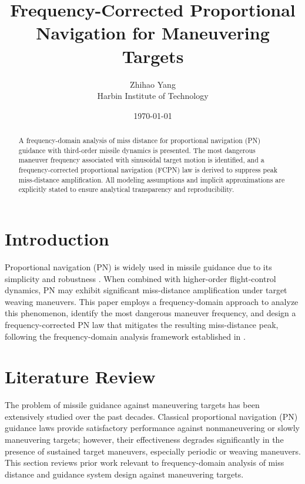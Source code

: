 \documentclass[11pt,a4paper]{article}
\title{Frequency-Corrected Proportional Navigation for Maneuvering Targets}
\author{Zhihao Yang \\ Harbin Institute of Technology}
\date{\today}
\begin{document}
\maketitle

\begin{abstract}
A frequency-domain analysis of miss distance for proportional navigation (PN) guidance with third-order missile dynamics is presented. The most dangerous maneuver frequency associated with sinusoidal target motion is identified, and a frequency-corrected proportional navigation (FCPN) law is derived to suppress peak miss-distance amplification. All modeling assumptions and implicit approximations are explicitly stated to ensure analytical transparency and reproducibility.
\end{abstract}

\section{Introduction}
Proportional navigation (PN) is widely used in missile guidance due to its simplicity and robustness \cite{Zarchan1995}.
 When combined with higher-order flight-control dynamics, PN may exhibit significant miss-distance amplification under target weaving maneuvers. This paper employs a frequency-domain approach to analyze this phenomenon, identify the most dangerous maneuver frequency, and design a frequency-corrected PN law that mitigates the resulting miss-distance peak, following the frequency-domain analysis framework established in \cite{Yanushevsky2004,Yanushevsky2007}.

\section{Literature Review}
\label{sec:literature}

The problem of missile guidance against maneuvering targets has been extensively studied over the past decades. Classical proportional navigation (PN) guidance laws provide satisfactory performance against nonmaneuvering or slowly maneuvering targets; however, their effectiveness degrades significantly in the presence of sustained target maneuvers, especially periodic or weaving maneuvers. This section reviews prior work relevant to frequency-domain analysis of miss distance and guidance system design against maneuvering targets.
\end{document}
